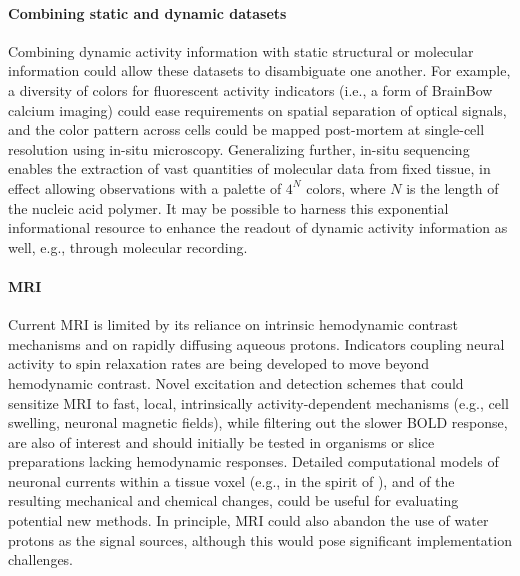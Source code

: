\paragraph{Combining static and dynamic datasets} Combining dynamic activity information with static structural or molecular information could allow these datasets to disambiguate one another. For example, a diversity of colors for fluorescent activity indicators (i.e., a form of BrainBow~\cite{livet07} calcium imaging) could ease requirements on spatial separation of optical signals, and the color pattern across cells could be mapped post-mortem at single-cell resolution using in-situ microscopy. Generalizing further, in-situ sequencing enables the extraction of vast quantities of molecular data from fixed tissue, in effect allowing observations with a palette of $4^N$ colors, where $N$ is the length of the nucleic acid polymer. It may be possible to harness this exponential informational resource to enhance the readout of dynamic activity information as well, e.g., through molecular recording.

\paragraph{MRI} Current MRI is limited by its reliance on intrinsic hemodynamic contrast mechanisms and on rapidly diffusing aqueous protons. Indicators coupling neural activity to spin relaxation rates are being developed to move beyond hemodynamic contrast. Novel excitation and detection schemes that could sensitize MRI to fast, local, intrinsically activity-dependent mechanisms (e.g., cell swelling, neuronal magnetic fields), while filtering out the slower BOLD response, are also of interest and should initially be tested in organisms or slice preparations lacking hemodynamic responses. Detailed computational models of neuronal currents within a tissue voxel (e.g., in the spirit of \cite{reimann2013biophysically}), and of the resulting mechanical and chemical changes, could be useful for evaluating potential new methods. In principle, MRI could also abandon the use of water protons as the signal sources, although this would pose significant implementation challenges.

